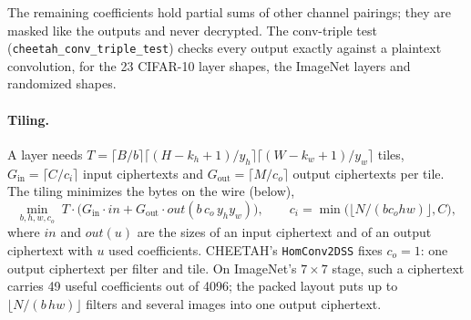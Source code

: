The remaining coefficients hold partial sums of other channel pairings; they are masked like the outputs and never
decrypted. The conv-triple test (\texttt{cheetah\_conv\_triple\_test}) checks every output exactly against a plaintext
convolution, for the 23 CIFAR-10 layer shapes, the ImageNet layers and randomized shapes.

\paragraph{Tiling.} A layer needs $T = \lceil B/b\rceil\lceil (H{-}k_h{+}1)/y_h\rceil\lceil (W{-}k_w{+}1)/y_w\rceil$
tiles, $G_{\mathrm{in}} = \lceil C/c_i\rceil$ input ciphertexts and $G_{\mathrm{out}} = \lceil M/c_o\rceil$ output
ciphertexts per tile. The tiling minimizes the bytes on the wire (below),
\[
  \min_{b, h, w, c_o}\; T\cdot\bigl(G_{\mathrm{in}}\cdot \mathit{in} + G_{\mathrm{out}}\cdot \mathit{out}(b\,c_o\,y_h y_w)\bigr),
  \qquad c_i = \min\bigl(\lfloor N/(b c_o h w)\rfloor, C\bigr),
\]
where $\mathit{in}$ and $\mathit{out}(u)$ are the sizes of an input ciphertext and of an output ciphertext with $u$
used coefficients. CHEETAH's \texttt{HomConv2DSS} fixes $c_o = 1$: one output ciphertext per filter and tile. On
ImageNet's $7\times 7$ stage, such a ciphertext carries 49 useful coefficients out of 4096; the packed layout
puts up to $\lfloor N/(b\,hw)\rfloor$ filters and several images into one output ciphertext.

